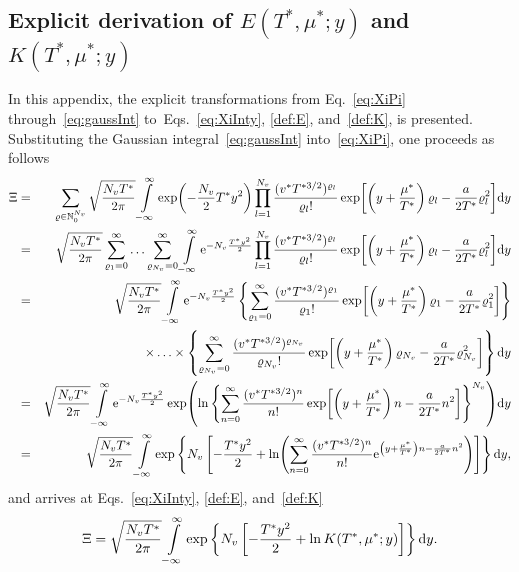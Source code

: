\documentclass[12pt]{article}
\numberwithin{equation}{section}
\begin{document}
	\subsection{\label{sec:app1} Explicit derivation of $E(T^*,\mu^*;y)$ and $K(T^*,\mu^*;y)$}
	In this appendix, the explicit transformations from Eq.~\eqref{eq:XiPi} through~\eqref{eq:gaussInt} to~Eqs.~\eqref{eq:XiInty}, \eqref{def:E}, and~\eqref{def:K}, is presented. Substituting the Gaussian integral~\eqref{eq:gaussInt} into~\eqref{eq:XiPi}, one proceeds as follows
	\begin{eqnarray}
		\Xi 
		&=& 
		\sum_{\varrho \in \mathbb{N}_0^{N_v}} \sqrt{\frac{N_v T^*}{2\pi}} \int\limits_{-\infty}^{\infty} \exp(-\frac{N_v}{2} T^* y^2) 
		\prod\limits_{l=1}^{N_v} \frac{(v^* T^{*3/2})^{\varrho_l}}{\varrho_l !} 
		\exp[\left(y + \frac{\mu^*}{T^*}\right) \varrho_l - \frac{a}{2T^*}\varrho_l^2] {\rm d}y
		\nonumber\\
		&=&
		\sqrt{\frac{N_v T^*}{2\pi}} \sum_{\varrho_1=0}^{\infty} \ldots \sum_{\varrho_{N_v}=0}^{\infty} 
		\int\limits_{-\infty}^{\infty} {\rm e}^{-N_v \frac{T^* y^2}{2}} 
		\prod\limits_{l=1}^{N_v} \frac{(v^* T^{*3/2})^{\varrho_l}}{\varrho_l !} 
		\exp[\left(y + \frac{\mu^*}{T^*}\right) \varrho_l - \frac{a}{2T^*}\varrho_l^2] {\rm d}y
		\nonumber\\
		&=&
		\sqrt{\frac{N_v T^*}{2\pi}} \int\limits_{-\infty}^{\infty} {\rm e}^{-N_v \frac{T^* y^2}{2}}
		\left\{ 
			\sum_{\varrho_1=0}^{\infty} \frac{(v^* T^{*3/2})^{\varrho_1}}{\varrho_1 !} \exp[\left(y + \frac{\mu^*}{T^*}\right) \varrho_1 - \frac{a}{2T^*}\varrho_1^2] 
		\right\}
		\nonumber\\
		&& 
		\times \ldots \times 
		\left\{ 
			\sum_{\varrho_{N_v}=0}^{\infty} \frac{(v^* T^{*3/2})^{\varrho_{N_v}}}{\varrho_{N_v} !} \exp[\left(y + \frac{\mu^*}{T^*}\right) \varrho_{N_v} - \frac{a}{2T^*}\varrho_{N_v}^2] 
		\right\}
		{\rm d}y
		\nonumber\\
		&=&
		\sqrt{\frac{N_v T^*}{2\pi}} \int\limits_{-\infty}^{\infty} {\rm e}^{-N_v \frac{T^* y^2}{2}}
		\exp( \ln \left\{\sum_{n=0}^{\infty} \frac{(v^* T^{*3/2})^{n}}{n!} \exp[\left(y + \frac{\mu^*}{T^*}\right)n - \frac{a}{2T^*}n^2] \right\}^{N_v} ) {\rm d}y
		\nonumber\\
		&=&
		\sqrt{\frac{N_v T^*}{2\pi}} \int\limits_{-\infty}^{\infty}
		\exp 
		\left\{ N_v 
			\left[ -\frac{T^* y^2}{2} + 
			\ln(\sum_{n=0}^{\infty} \frac{(v^* T^{*3/2})^{n}}{n!} {\rm e}^{\left(y + \frac{\mu^*}{T^*}\right)n - \frac{a}{2T^*}n^2}) 
			\right] 
		\right\} {\rm d}y,
	\end{eqnarray}
	and arrives at Eqs.~\eqref{eq:XiInty}, \eqref{def:E}, and~\eqref{def:K}
	\begin{equation}
		\Xi = \sqrt{\frac{N_v T^*}{2\pi}} \int\limits_{-\infty}^{\infty}
		\exp 
		\left\{ N_v 
		\left[ -\frac{T^* y^2}{2} + 
		\ln K(T^*,\mu^*;y) 
		\right] 
		\right\} {\rm d}y.
	\end{equation}
	
\end{document}
